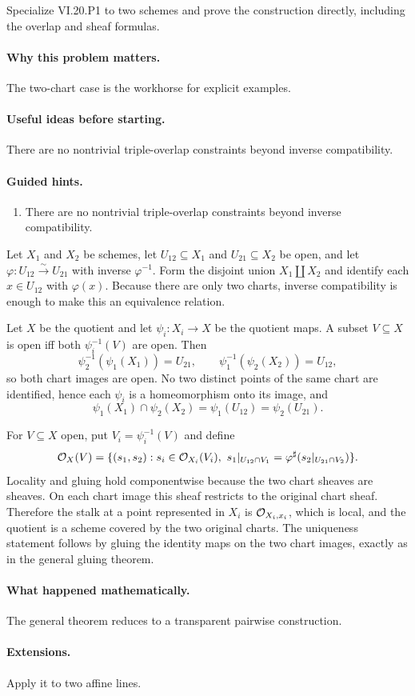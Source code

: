\begin{problem}\label{prob:vi20-p03}
Specialize VI.20.P1 to two schemes and prove the construction directly, including the overlap and sheaf formulas.
\end{problem}

\ifdefined\FullProblemDossiers
\paragraph{Why this problem matters.}
The two-chart case is the workhorse for explicit examples.

\paragraph{Useful ideas before starting.}
There are no nontrivial triple-overlap constraints beyond inverse compatibility.

\paragraph{Guided hints.}
\begin{enumerate}
\item There are no nontrivial triple-overlap constraints beyond inverse compatibility.
\end{enumerate}

\begin{solution}
Let $X_1$ and $X_2$ be schemes, let $U_{12}\subseteq X_1$ and $U_{21}\subseteq X_2$ be open, and let $\varphi:U_{12}\xrightarrow{\sim}U_{21}$ with inverse $\varphi^{-1}$.  Form the disjoint union $X_1\amalg X_2$ and identify each $x\in U_{12}$ with $\varphi(x)$.  Because there are only two charts, inverse compatibility is enough to make this an equivalence relation.

Let $X$ be the quotient and let $\psi_i:X_i\to X$ be the quotient maps.  A subset $V\subseteq X$ is open iff both $\psi_i^{-1}(V)$ are open.  Then
\[
\psi_2^{-1}(\psi_1(X_1))=U_{21},\qquad
\psi_1^{-1}(\psi_2(X_2))=U_{12},
\]
so both chart images are open.  No two distinct points of the same chart are identified, hence each $\psi_i$ is a homeomorphism onto its image, and
\[
\psi_1(X_1)\cap\psi_2(X_2)=\psi_1(U_{12})=\psi_2(U_{21}).
\]

For $V\subseteq X$ open, put $V_i=\psi_i^{-1}(V)$ and define
\[
\OO_X(V)=\{(s_1,s_2):s_i\in\OO_{X_i}(V_i),\ s_1|_{U_{12}\cap V_1}=\varphi^\sharp(s_2|_{U_{21}\cap V_2})\}.
\]
Locality and gluing hold componentwise because the two chart sheaves are sheaves.  On each chart image this sheaf restricts to the original chart sheaf.  Therefore the stalk at a point represented in $X_i$ is $\mathcal O_{X_i,x_i}$, which is local, and the quotient is a scheme covered by the two original charts.  The uniqueness statement follows by gluing the identity maps on the two chart images, exactly as in the general gluing theorem.
\end{solution}


\paragraph{What happened mathematically.}
The general theorem reduces to a transparent pairwise construction.

\paragraph{Extensions.}
Apply it to two affine lines.
\fi
